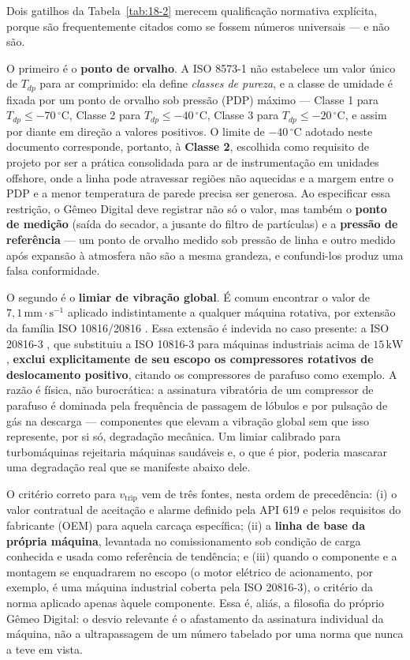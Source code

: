 \documentclass[12pt,a4paper]{article}
\numberwithin{equation}{section}
\numberwithin{table}{section}
\numberwithin{figure}{section}
\begin{document}
{Dois gatilhos da Tabela~\ref{tab:18-2} merecem qualificação normativa explícita, porque são frequentemente citados como se fossem números universais — e não são.

O primeiro é o \textbf{ponto de orvalho}. A ISO 8573-1 \cite{iso8573} não estabelece um valor único de $T_{dp}$ para ar comprimido: ela define \textit{classes de pureza}, e a classe de umidade é fixada por um ponto de orvalho sob pressão (PDP) máximo — Classe 1 para $T_{dp} \le -70\,^{\circ}$C, Classe 2 para $T_{dp} \le -40\,^{\circ}$C, Classe 3 para $T_{dp} \le -20\,^{\circ}$C, e assim por diante em direção a valores positivos. O limite de $-40\,^{\circ}$C adotado neste documento corresponde, portanto, à \textbf{Classe 2}, escolhida como requisito de projeto por ser a prática consolidada para ar de instrumentação em unidades offshore, onde a linha pode atravessar regiões não aquecidas e a margem entre o PDP e a menor temperatura de parede precisa ser generosa. Ao especificar essa restrição, o Gêmeo Digital deve registrar não só o valor, mas também o \textbf{ponto de medição} (saída do secador, a jusante do filtro de partículas) e a \textbf{pressão de referência} — um ponto de orvalho medido sob pressão de linha e outro medido após expansão à atmosfera não são a mesma grandeza, e confundi-los produz uma falsa conformidade.

O segundo é o \textbf{limiar de vibração global}. É comum encontrar o valor de $7{,}1\,\text{mm}\cdot\text{s}^{-1}$ aplicado indistintamente a qualquer máquina rotativa, por extensão da família ISO 10816/20816 \cite{iso10816, iso20816}. Essa extensão é indevida no caso presente: a ISO 20816-3 \cite{iso20816}, que substituiu a ISO 10816-3 para máquinas industriais acima de $15\,\text{kW}$, \textbf{exclui explicitamente de seu escopo os compressores rotativos de deslocamento positivo}, citando os compressores de parafuso como exemplo. A razão é física, não burocrática: a assinatura vibratória de um compressor de parafuso é dominada pela frequência de passagem de lóbulos e por pulsação de gás na descarga — componentes que elevam a vibração global sem que isso represente, por si só, degradação mecânica. Um limiar calibrado para turbomáquinas rejeitaria máquinas saudáveis e, o que é pior, poderia mascarar uma degradação real que se manifeste abaixo dele.

O critério correto para $v_{\text{trip}}$ vem de três fontes, nesta ordem de precedência: (i) o valor contratual de aceitação e alarme definido pela API 619 \cite{api619} e pelos requisitos do fabricante (OEM) para aquela carcaça específica; (ii) a \textbf{linha de base da própria máquina}, levantada no comissionamento sob condição de carga conhecida e usada como referência de tendência; e (iii) quando o componente e a montagem se enquadrarem no escopo (o motor elétrico de acionamento, por exemplo, é uma máquina industrial coberta pela ISO 20816-3), o critério da norma aplicado apenas àquele componente. Essa é, aliás, a filosofia do próprio Gêmeo Digital: o desvio relevante é o afastamento da assinatura individual da máquina, não a ultrapassagem de um número tabelado por uma norma que nunca a teve em vista.

}
\end{document}
